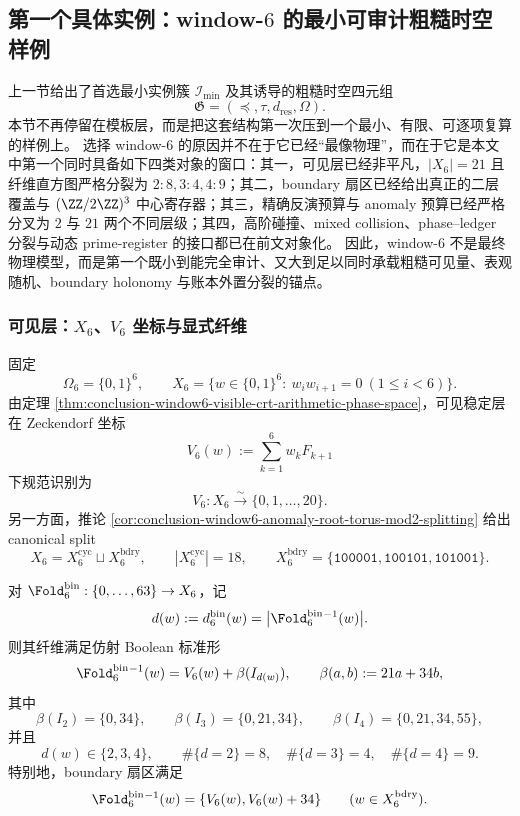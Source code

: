 \subsection{第一个具体实例：window-\texorpdfstring{$6$}{6} 的最小可审计粗糙时空样例}\label{subsec:typed-address-biaxial-completion-window6-auditable-rough-spacetime-example}
上一节给出了首选最小实例簇 \(\mathcal I_{\min}\) 及其诱导的粗糙时空四元组
\[
\mathfrak G=(\preceq,\tau,d_{\mathrm{res}},\Omega).
\]
本节不再停留在模板层，而是把这套结构第一次压到一个最小、有限、可逐项复算的样例上。
选择 window-\(6\) 的原因并不在于它已经“最像物理”，而在于它是本文中第一个同时具备如下四类对象的窗口：其一，可见层已经非平凡，\(|X_6|=21\) 且纤维直方图严格分裂为 \(2{:}8,3{:}4,4{:}9\)；其二，boundary 扇区已经给出真正的二层覆盖与 \((\ZZ/2\ZZ)^3\) 中心寄存器；其三，精确反演预算与 anomaly 预算已经严格分叉为 \(2\) 与 \(21\) 两个不同层级；其四，高阶碰撞、mixed collision、phase--ledger 分裂与动态 prime-register 的接口都已在前文对象化。
因此，window-\(6\) 不是最终物理模型，而是第一个既小到能完全审计、又大到足以同时承载粗糙可见量、表观随机、boundary holonomy 与账本外置分裂的锚点。

\subsubsection{可见层：\texorpdfstring{$X_6$}{X6}、\texorpdfstring{$V_6$}{V6} 坐标与显式纤维}\label{subsubsec:typed-address-biaxial-completion-window6-visible-layer}
固定
\[
\Omega_6=\{0,1\}^6,
\qquad
X_6=\{w\in\{0,1\}^6:\ w_iw_{i+1}=0\ (1\le i<6)\}.
\]
由定理 \ref{thm:conclusion-window6-visible-crt-arithmetic-phase-space}，可见稳定层在 Zeckendorf 坐标
\[
V_6(w):=\sum_{k=1}^{6}w_kF_{k+1}
\]
下规范识别为
\[
V_6:X_6\overset{\sim}{\longrightarrow}\{0,1,\dots,20\}.
\]
另一方面，推论 \ref{cor:conclusion-window6-anomaly-root-torus-mod2-splitting} 给出 canonical split
\[
X_6=X_6^{\mathrm{cyc}}\sqcup X_6^{\mathrm{bdry}},
\qquad
|X_6^{\mathrm{cyc}}|=18,
\qquad
X_6^{\mathrm{bdry}}=\{\texttt{100001},\texttt{100101},\texttt{101001}\}.
\]

\begin{proposition}\label{prop:typed-address-biaxial-completion-window6-explicit-fibers}
对 \(\Fold_6^{\mathrm{bin}}:\{0,\dots,63\}\to X_6\)，记
\[
d(w):=d_6^{\mathrm{bin}}(w)=\bigl|\Fold_6^{\mathrm{bin}}{}^{-1}(w)\bigr|.
\]
则其纤维满足仿射 Boolean 标准形
\[
\Fold_6^{\mathrm{bin}}{}^{-1}(w)=V_6(w)+\beta(I_{d(w)}),
\qquad
\beta(a,b):=21a+34b,
\]
其中
\[
\beta(I_2)=\{0,34\},
\qquad
\beta(I_3)=\{0,21,34\},
\qquad
\beta(I_4)=\{0,21,34,55\},
\]
并且
\[
d(w)\in\{2,3,4\},
\qquad
\#\{d=2\}=8,\quad
\#\{d=3\}=4,\quad
\#\{d=4\}=9.
\]
特别地，boundary 扇区满足
\[
\Fold_6^{\mathrm{bin}}{}^{-1}(w)=\{V_6(w),V_6(w)+34\}
\qquad (w\in X_6^{\mathrm{bdry}}).
\]
\end{proposition}

